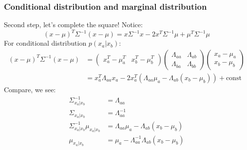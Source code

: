 \documentclass{beamer}
\begin{document}
\begin{frame}
    \frametitle{Conditional distribution and marginal distribution}
    Second step, let's complete the square! Notice:
    \begin{equation*}
        (x-\mu)^{T}\Sigma^{-1}(x-\mu)=x\Sigma^{-1}x-2x^{T}\Sigma^{-1}\mu+\mu^{T}\Sigma^{-1}\mu
    \end{equation*}
    For conditional distribution $p(x_{a}|x_{b})$:
    \begin{align*}
        (x-\mu)^{T}\Sigma^{-1}(x-\mu)&=\begin{pmatrix}
            x_{a}^{T}-\mu_{a}^{T}&x_{b}^{T}-\mu_{b}^{T}
        \end{pmatrix}
        \begin{pmatrix}
            \Lambda_{aa}&\Lambda_{ab} \\
            \Lambda_{ba}&\Lambda_{bb}
        \end{pmatrix}
        \begin{pmatrix}
            x_{a}-\mu_{a} \\
            x_{b}-\mu_{b}
        \end{pmatrix} \\
        &=x_{a}^{T}\Lambda_{aa}x_{a}-2x_{a}^{T}(\Lambda_{aa}\mu_{a}-\Lambda_{ab}(x_{b}-\mu_{b}))+\mathrm{const}
    \end{align*}
    Compare, we see:
    \begin{align*}
        \Sigma_{x_{a}|x_{b}}^{-1}&=\Lambda_{aa} \\
        \Sigma_{x_{a}|x_{b}}&=\Lambda_{aa}^{-1} \\
        \Sigma_{x_{a}|x_{b}}^{-1}\mu_{x_{a}|x_{b}}&=\Lambda_{aa}\mu_{a}-\Lambda_{ab}(x_{b}-\mu_{b}) \\
        \mu_{x_{a}|x_{b}}&=\mu_{a}-\Lambda_{aa}^{-1}\Lambda_{ab}(x_{b}-\mu_{b})
    \end{align*}
\end{frame}
\end{document}
